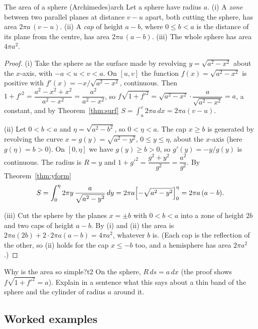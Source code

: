 \documentclass[11pt]{article}
\begin{document}
\begin{thm}{The area of a sphere (Archimedes)}{arch}
Let a sphere have radius $a$. (i) A \emph{zone} between two parallel planes at distance $v-u$ apart, both cutting the sphere, has area $2\pi a\,(v-u)$. (ii) A \emph{cap} of height $a-b$, where $0\le b<a$ is the distance of its plane from the centre, has area $2\pi a\,(a-b)$. (iii) The whole sphere has area $4\pi a^2$.
\end{thm}
\begin{proof}
(i) Take the sphere as the surface made by revolving $y=\sqrt{a^2-x^2}$ about the $x$-axis, with $-a<u<v<a$. On $[u,v]$ the function $f(x)=\sqrt{a^2-x^2}$ is positive with $f'(x)=-x/\sqrt{a^2-x^2}$, continuous. Then $1+f'^2=\dfrac{a^2-x^2+x^2}{a^2-x^2}=\dfrac{a^2}{a^2-x^2}$, so $f\sqrt{1+f'^2}=\sqrt{a^2-x^2}\cdot\dfrac a{\sqrt{a^2-x^2}}=a$, a constant, and by Theorem~\ref{thm:surf} $S=\int_u^v2\pi a\,dx=2\pi a(v-u)$.

(ii) Let $0<b<a$ and $\eta=\sqrt{a^2-b^2}$, so $0<\eta<a$. The cap $x\ge b$ is generated by revolving the curve $x=g(y)=\sqrt{a^2-y^2}$, $0\le y\le\eta$, about the $x$-axis (here $g(\eta)=b>0$). On $[0,\eta]$ we have $g(y)\ge b>0$, so $g'(y)=-y/g(y)$ is continuous. The radius is $R=y$ and $1+g'^2=\dfrac{g^2+y^2}{g^2}=\dfrac{a^2}{g^2}$. By Theorem~\ref{thm:yform}
\[
S=\int_0^\eta2\pi y\,\frac{a}{\sqrt{a^2-y^2}}\,dy=2\pi a\Bigl[-\sqrt{a^2-y^2}\Bigr]_0^\eta=2\pi a\,(a-b).
\]

(iii) Cut the sphere by the planes $x=\pm b$ with $0<b<a$ into a zone of height $2b$ and two caps of height $a-b$. By (i) and (ii) the area is $2\pi a(2b)+2\cdot2\pi a(a-b)=4\pi a^2$, whatever $b$ is. (Each cap is the reflection of the other, so (ii) holds for the cap $x\le-b$ too, and a hemisphere has area $2\pi a^2$.)
\end{proof}

\begin{think}{Why is the area so simple?}{t2}
On the sphere, $R\,ds=a\,dx$ (the proof shows $f\sqrt{1+f'^2}=a$). Explain in a sentence what this says about a thin band of the sphere and the cylinder of radius $a$ around it.
\end{think}

\subsection*{Worked examples}
\end{document}
